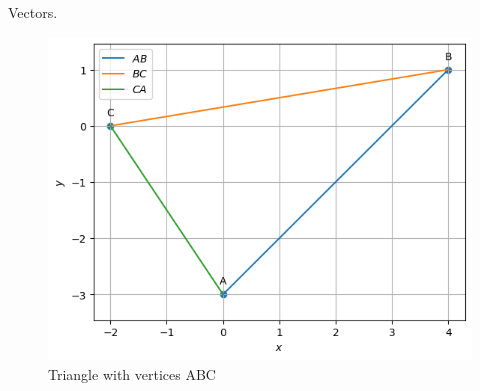 \begin{table}[H]
        \centering
        
        \caption{Vectors.}
        \label{tab:Vectors}
    \end{table}
\begin{figure}[H]
\includegraphics[width=\columnwidth]{vectors/figs/Triangle.png}
\caption{Triangle with vertices ABC}
\label{fig:i_triangle_py}
\end{figure}

